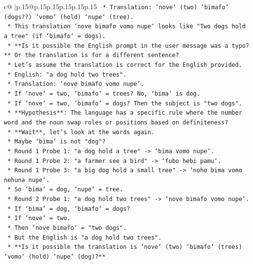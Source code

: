 \documentclass{article}
\begin{document}
{\begin{supertabular}{c@{$\;$}|p{.15\linewidth}@{}p{.15\linewidth}p{.15\linewidth}p{.15\linewidth}p{.15\linewidth}p{.15\linewidth}}
{{{\texttt{            *   Translation: `nove` (two) `bimafo` (dogs??) `vomo` (hold) `nupe` (tree).} \\
\texttt{            *   This translation `nove bimafo vomo nupe` looks like "Two dogs hold a tree" (if `bimafo` = dogs).} \\
\texttt{            *   **Is it possible the English prompt in the user message was a typo?** Or the translation is for a different sentence?} \\
\texttt{            *   Let's assume the translation is correct for the English provided.} \\
\texttt{            *   English: "a dog hold two trees".} \\
\texttt{            *   Translation: `nove bimafo vomo nupe`.} \\
\texttt{            *   If `nove` = two, `bimafo` = trees? No, `bima` is dog.} \\
\texttt{            *   If `nove` = two, `bimafo` = dogs? Then the subject is "two dogs".} \\
\texttt{            *   **Hypothesis**: The language has a specific rule where the number word and the noun swap roles or positions based on definiteness?} \\
\texttt{            *   **Wait**, let's look at the words again.} \\
\texttt{            *   Maybe `bima` is not "dog"?} \\
\texttt{            *   Round 1 Probe 1: "a dog hold a tree" {-}> `bima vomo nupe`.} \\
\texttt{            *   Round 1 Probe 2: "a farmer see a bird" {-}> `fubo hebi pamu`.} \\
\texttt{            *   Round 1 Probe 3: "a big dog hold a small tree" {-}> `noho bima vomo nehuna nupe`.} \\
\texttt{            *   So `bima` = dog, `nupe` = tree.} \\
\texttt{            *   Round 2 Probe 1: "a dog hold two trees" {-}> `nove bimafo vomo nupe`.} \\
\texttt{            *   If `bima` = dog, `bimafo` = dogs?} \\
\texttt{            *   If `nove` = two.} \\
\texttt{            *   Then `nove bimafo` = "two dogs".} \\
\texttt{            *   But the English is "a dog hold two trees".} \\
\texttt{            *   **Is it possible the translation is `nove` (two) `bimafo` (trees) `vomo` (hold) `nupe` (dog)?**} \\
}}}
\end{supertabular}}
\end{document}
